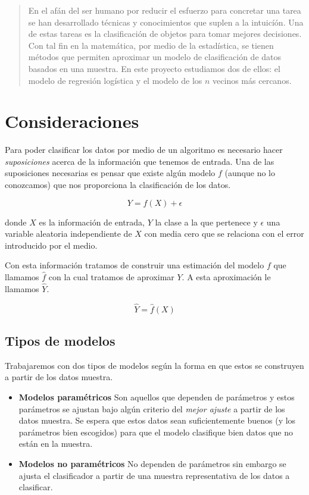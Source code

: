 \documentclass[11pt,letterpaper, reqno]{article}
\begin{document}
\pagebreak
\pagestyle{plain}

\begin{abstract}
En el afán del ser humano por reducir el esfuerzo para concretar una tarea se han desarrollado técnicas y conocimientos que suplen a la intuicíón. Una de estas tareas es la clasificación de objetos para tomar mejores decisiones. Con tal fin en la matemática, por medio de la estadística, se tienen métodos que permiten aproximar un modelo de clasificación de datos basados en una muestra. En este proyecto estudiamos dos de ellos: el modelo de regresión logística y el modelo de los $n$ vecinos más cercanos.
\end{abstract}

\section{Consideraciones}

Para poder clasificar los datos por medio de un algoritmo es necesario hacer \textit{suposiciones} acerca de la información que tenemos de entrada. Una de las suposiciones necesarias es pensar que existe algún modelo $f$ (aunque no lo conozcamos) que nos proporciona la clasificación de los datos.

$$
Y = f(X) + \epsilon
$$

donde $X$ es la información de entrada, $Y$ la clase a la que pertenece y $\epsilon$  una variable aleatoria independiente de $X$ con media cero que se relaciona con el error introducido por el medio.

Con esta información tratamos de construir una estimación del modelo $f$ que llamamos $\hat{f}$ con la cual tratamos de aproximar $Y$. A esta aproximación le llamamos $\hat{Y}$.

$$
\hat{Y} = \hat{f}(X)
$$

\subsection{Tipos de modelos}

Trabajaremos con dos tipos de modelos según la forma en que estos se construyen a partir de los datos muestra.

\begin{itemize}
	\item \textbf{Modelos paramétricos} Son aquellos que dependen de parámetros y estos parámetros se ajustan bajo algún criterio del \textit{mejor ajuste} a partir de los datos muestra. Se espera que estos datos sean suficientemente buenos (y los parámetros bien escogidos) para que el modelo clasifique bien datos que no están en la muestra.
	\item \textbf{Modelos no paramétricos} No dependen de parámetros sin embargo se ajusta el clasificador a partir de una muestra representativa de los datos a clasificar.
\end{itemize}
\end{document}
